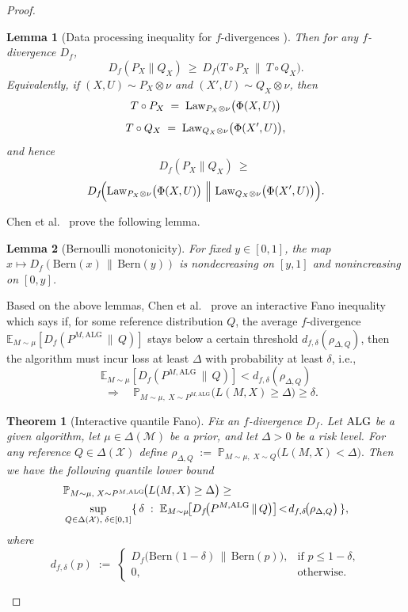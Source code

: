 \documentclass[conference]{IEEEtran}
\newtheorem{theorem}{Theorem}
\newtheorem{lemma}{Lemma}
\begin{document}
\begin{proof}[Proof]
\begin{lemma}[Data processing inequality for \(f\)-divergences \cite{polyanskiy2025information}]
Then for any \(f\)-divergence \(D_f\),
\[
D_f(P_X\|Q_X)\ \ge\ D_f\big(T\circ P_X\ \|\ T\circ Q_X\big).
\]
Equivalently, if \((X,U)\sim P_X\otimes \nu\) and \((X',U)\sim Q_X\otimes \nu\), then
\[
T\circ P_X \;=\; \textup{Law}_{P_X\otimes \nu}\big(\Phi(X,U)\big)
\]
\[
T\circ Q_X \;=\; \textup{Law}_{Q_X\otimes \nu}\big(\Phi(X',U)\big),
\]
and hence
\[
D_f(P_X\|Q_X)\ \ge\ \]
\[
D_f\!\Big(\textup{Law}_{P_X\otimes \nu}\big(\Phi(X,U)\big)\ \Big\|\ 
\textup{Law}_{Q_X\otimes \nu}\big(\Phi(X',U)\big)\Big).
\]
\end{lemma}

Chen et al.~\cite{chen2024assouad} prove the following lemma.


\begin{lemma}[Bernoulli monotonicity]
\label{lem:bern-mono}
For fixed \(y\in[0,1]\), the map \(x\mapsto D_f(\mathrm{Bern}(x)\,\|\,\mathrm{Bern}(y))\)
is nondecreasing on \([y,1]\) and nonincreasing on \([0,y]\).
\end{lemma}
Based on the above lemmas, Chen et al.~\cite{chen2024assouad} prove an interactive Fano inequality
which says if, for some reference distribution $Q$, the average $f$-divergence
\(
\mathbb{E}_{M\sim\mu}\!\left[D_f\!\left(P^{M,\mathrm{ALG}}\,\|\,Q\right)\right]
\)
stays below a certain threshold $d_{f,\delta}\!\left(\rho_{\Delta,Q}\right)$, then the algorithm must incur loss at least $\Delta$ with probability at least $\delta$, i.e.,
\[
\mathbb{E}_{M\sim\mu}\!\left[D_f\!\left(P^{M,\mathrm{ALG}}\,\|\,Q\right)\right]
< d_{f,\delta}\!\left(\rho_{\Delta,Q}\right)
\]
\[
\quad\Longrightarrow\quad
\mathbb{P}_{M\sim\mu,\;X\sim P^{M,\mathrm{ALG}}}\!\big(L(M,X)\ge \Delta\big)\ge \delta.
\]
\begin{theorem}[Interactive quantile Fano]
\label{thm:Fano-expected-risk}
Fix an \(f\)-divergence \(D_f\). Let \(\textup{ALG}\) be a given algorithm, let \(\mu\in\Delta(\mathcal M)\) be a prior, and let \(\Delta>0\) be a risk level. For any reference \(Q\in\Delta(\mathcal X)\) define
\(
\rho_{\Delta,Q}\;:=\; \mathbb P_{M\sim\mu,\; X\sim Q}\!\big(L(M,X)<\Delta\big).
\)
Then we have the following quantile lower bound 
\[
\begin{aligned}
&\mathbb P_{M\sim\mu,\; X\sim P^{M,\textup{ALG}}}\!\big(L(M,X)\ge \Delta\big)
\ge
\\
&\sup_{Q\in\Delta(\mathcal X),\; \delta\in[0,1]} \{\,
\delta \;:\; \mathbb{E}_{M\sim\mu}\!\big[D_f\!\big(P^{M,\textup{ALG}}\,\|\,Q\big)\big]
\!<\! d_{f,\delta}\!\big(\rho_{\Delta,Q}\big)
\,\},
\end{aligned}
\]
where
\[
d_{f,\delta}(p)\;:=\;
\begin{cases}
D_f\!\big(\mathrm{Bern}(1-\delta)\,\big\|\,\mathrm{Bern}(p)\big), & \text{if } p\le 1-\delta,\\[4pt]
0, & \text{otherwise.}
\end{cases}
\]
\end{theorem}


\end{proof}
\end{document}

